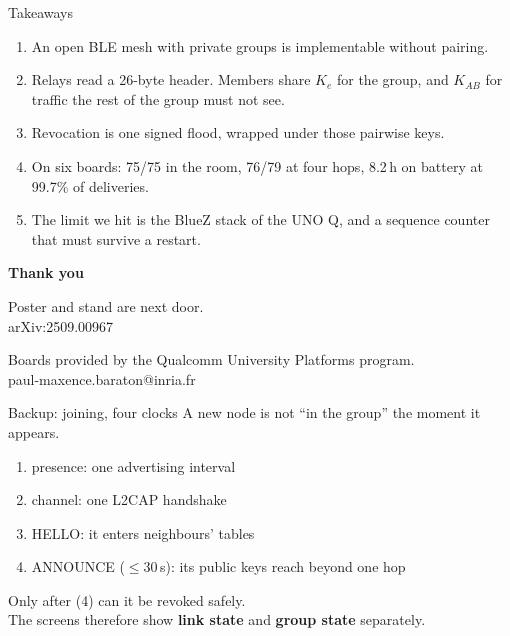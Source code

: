 \documentclass[aspectratio=169,11pt]{beamer}
\begin{document}
\begin{frame}{Takeaways}
\begin{enumerate}
  \item An open BLE mesh with private groups is implementable without pairing.
  \item Relays read a 26-byte header. Members share $K_e$ for the group,
        and $K_{AB}$ for traffic the rest of the group must not see.
  \item Revocation is one signed flood, wrapped under those pairwise keys.
  \item On six boards: 75/75 in the room, 76/79 at four hops, 8.2\,h on
        battery at 99.7\% of deliveries.
  \item The limit we hit is the BlueZ stack of the UNO Q, and a sequence
        counter that must survive a restart.
\end{enumerate}
\end{frame}

\begin{frame}[plain]
\vspace{14mm}
{\color{white}\bfseries\Huge Thank you\par}
\vspace{8mm}
{\color{white!85}Poster and stand are next door.\\
arXiv:2509.00967\par}
\vspace{10mm}
{\color{white!65}Boards provided by the Qualcomm University Platforms program.\\
paul-maxence.baraton@inria.fr}
\end{frame}

\appendix
\begin{frame}{Backup: joining, four clocks}
A new node is not ``in the group'' the moment it appears.
\begin{enumerate}
  \item presence: one advertising interval
  \item channel: one L2CAP handshake
  \item HELLO: it enters neighbours' tables
  \item ANNOUNCE ($\le$30\,s): its public keys reach beyond one hop
\end{enumerate}
\vspace{4mm}
Only after (4) can it be revoked safely.\\
The screens therefore show \textbf{link state} and \textbf{group state} separately.
\end{frame}
\end{document}
